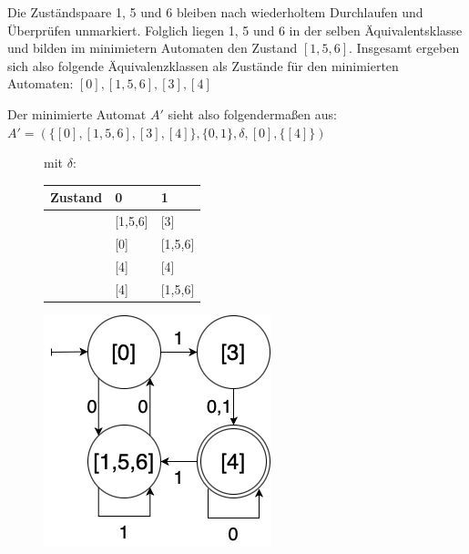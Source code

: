 	Die Zuständspaare 1, 5 und 6 bleiben nach wiederholtem Durchlaufen und Überprüfen unmarkiert. Folglich liegen 1, 5 und 6 in der selben Äquivalentsklasse und bilden im minimietern Automaten den Zustand $[1,5,6]$. Insgesamt ergeben sich also folgende Äquivalenzklassen als Zustände für den minimierten Automaten: $[0],[1,5,6],[3],[4]$
	
	Der minimierte Automat $A'$ sieht also folgendermaßen aus: \\
	$A' = (\{[0],[1,5,6],[3],[4] \},\{0,1\},\delta, [0], \{[4]\})$

	\begin{figure}[ht]
		\begin{minipage}[t]{.4\textwidth}
			\hspace*{25pt}
			mit $\delta$:

			\hspace*{25pt}
			\begin{tabular}{|l|l|l|}
				\hline
				\textbf{Zustand} & \textbf{0} & \textbf{1} \\
				\hline
				[0]            & [1,5,6]    & [3] \\ 
				\hline
				[1,5,6]        & [0]        & [1,5,6] \\
				\hline
				[3]            & [4]        & [4] \\
				\hline  
				[4]            & [4]        & [1,5,6] \\
				\hline 
			\end{tabular}
		\end{minipage}
		\begin{minipage}[t]{.57\textwidth}
			\vspace*{0pt}
			\hspace*{20pt}
			\includegraphics[scale=0.35]{DEA_T1_A1.png}
		\end{minipage} 
	\end{figure}
	
